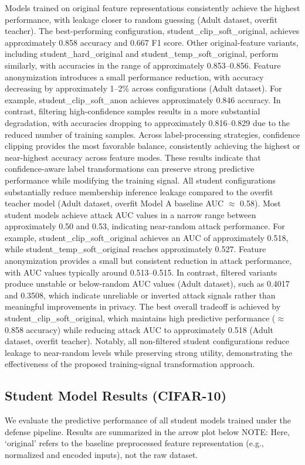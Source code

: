 \documentclass[conference]{IEEEtran}
\begin{document}
Models trained on original feature representations consistently achieve the highest performance, with leakage closer to random guessing (Adult dataset, overfit teacher). The best-performing configuration, student\_clip\_soft\_original, achieves approximately 0.858 accuracy and 0.667 F1 score. Other original-feature variants, including student\_hard\_original and student\_temp\_soft\_original, perform similarly, with accuracies in the range of approximately 0.853--0.856.
Feature anonymization introduces a small performance reduction, with accuracy decreasing by approximately 1--2\% across configurations (Adult dataset). For example, student\_clip\_soft\_anon achieves approximately 0.846 accuracy. In contrast, filtering high-confidence samples results in a more substantial degradation, with accuracies dropping to approximately 0.816--0.829 due to the reduced number of training samples.
Across label-processing strategies, confidence clipping provides the most favorable balance, consistently achieving the highest or near-highest accuracy across feature modes. These results indicate that confidence-aware label transformations can preserve strong predictive performance while modifying the training signal.
All student configurations substantially reduce membership inference leakage compared to the overfit teacher model (Adult dataset, overfit Model A baseline AUC $\approx$ 0.58). Most student models achieve attack AUC values in a narrow range between approximately 0.50 and 0.53, indicating near-random attack performance. For example, student\_clip\_soft\_original achieves an AUC of approximately 0.518, while student\_temp\_soft\_original reaches approximately 0.527.
Feature anonymization provides a small but consistent reduction in attack performance, with AUC values typically around 0.513--0.515. In contrast, filtered variants produce unstable or below-random AUC values (Adult dataset), such as 0.4017 and 0.3508, which indicate unreliable or inverted attack signals rather than meaningful improvements in privacy.
The best overall tradeoff is achieved by student\_clip\_soft\_original, which maintains high predictive performance ($\approx$0.858 accuracy) while reducing attack AUC to approximately 0.518 (Adult dataset, overfit teacher). Notably, all non-filtered student configurations reduce leakage to near-random levels while preserving strong utility, demonstrating the effectiveness of the proposed training-signal transformation approach.

\subsection{Student Model Results (CIFAR-10)}
We evaluate the predictive performance of all student models trained under the defense pipeline. Results are summarized in the arrow plot below
NOTE: Here, ‘original’ refers to the baseline preprocessed feature representation (e.g., normalized and encoded inputs), not the raw dataset.
\end{document}
